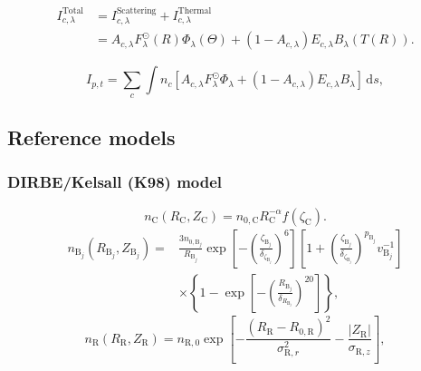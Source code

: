 \documentclass{aa}
\begin{document}
\begin{align}
    I^\mathrm{Total}_{c, \lambda} &= I^\mathrm{Scattering}_{c,\lambda} + I^\mathrm{Thermal}_{c,\lambda}\\
    &= A_{c, \lambda} F_\lambda^\odot(R) \Phi_\lambda(\Theta) + \left( 1 - A_{c, \lambda} \right) E_{c,\lambda} B_\lambda(T(R)).
\end{align}

\begin{equation}\label{eq: intensity}
    I_{p,t} = \sum_c \int n_c \left[  A_{c, \lambda} F_\lambda^\odot \Phi_\lambda + \left( 1 - A_{c, \lambda} \right) E_{c,\lambda} B_\lambda \right]\,\mathrm ds,
\end{equation}

\subsection{Reference models}

\subsubsection{DIRBE/Kelsall (K98) model}

\begin{equation}
n_\mathrm{C}(R_\mathrm{C}, Z_\mathrm{C}) = n_{0,\mathrm{C}} R_\mathrm{C}^{-\alpha} f(\zeta_\mathrm{C}).
\end{equation}
\begin{equation}
    \begin{aligned}
        n_{\mathrm{B}_j}(R_{\mathrm{B}_j}, Z_{\mathrm{B}_j})=& \frac{3 n_{0, \mathrm{B}_j}}{R_{\mathrm{B}_j}} \exp \left[-\left(\frac{\zeta_{\mathrm{B}_j}}{\delta_{\zeta_{\mathrm B_j}}}\right)^{6}\right]\left[1 + \left(\frac{\zeta_{\mathrm{B}_j}}{\delta_{\zeta_{\mathrm{B}_j}}}\right)^{p_{\mathrm{B}_j}}v^{-1}_{\mathrm{B}_j}\right] \\
        & \times\left\{1-\exp \left[-\left(\frac{R_{\mathrm{B}_j}}{\delta_{R_{\mathrm{B}_j}}}\right)^{20}\right]\right\},
    \end{aligned}
\end{equation}
\begin{equation}\label{eq: ring}
    n_\mathrm{R}(R_\mathrm{R}, Z_\mathrm{R})=n_{\mathrm{R},0} \exp \left[-\frac{\left(R_\mathrm{R}-R_{0, \mathrm{R}}\right)^2}{\sigma_{\mathrm{R}, r} ^2}-\frac{\left| Z_\mathrm{R} \right|}{\sigma_{\mathrm{R}, z}}\right],
\end{equation}
\end{document}
